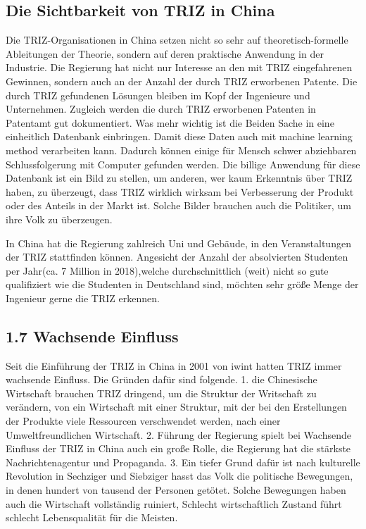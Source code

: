\documentclass[11pt,a4paper]{article}
\begin{document}
\subsection{Die Sichtbarkeit von TRIZ in China}
Die TRIZ-Organisationen in China setzen nicht so sehr auf theoretisch-formelle
Ableitungen der Theorie, sondern auf deren praktische Anwendung in der
Industrie.  Die Regierung hat nicht nur Interesse an den mit TRIZ
eingefahrenen Gewinnen, sondern auch an der Anzahl der durch TRIZ erworbenen
Patente. Die durch TRIZ gefundenen Lösungen bleiben im Kopf der Ingenieure und
Unternehmen. Zugleich werden die durch TRIZ erworbenen Patenten in Patentamt
gut dokumentiert. Was mehr wichtig ist die Beiden Sache in eine einheitlich
Datenbank einbringen. Damit diese Daten auch mit machine learning method
verarbeiten kann. Dadurch können einige für Mensch schwer abziehbaren
Schlussfolgerung mit Computer gefunden werden. Die billige Anwendung für diese
Datenbank ist ein Bild zu stellen, um anderen, wer kaum Erkenntnis über TRIZ
haben, zu überzeugt, dass TRIZ wirklich wirksam bei Verbesserung der Produkt
oder des Anteils in der Markt ist. Solche Bilder brauchen auch die Politiker,
um ihre Volk zu überzeugen.

In China hat die Regierung zahlreich Uni und Gebäude, in den Veranstaltungen
der TRIZ stattfinden können. Angesicht der Anzahl der absolvierten Studenten
per Jahr(ca. 7 Million in 2018),welche durchschnittlich (weit) nicht so gute
qualifiziert wie die Studenten in Deutschland sind, möchten  sehr größe Menge
der Ingenieur  gerne die TRIZ erkennen.  
  
\subsection{1.7 Wachsende Einfluss}

Seit die Einführung der TRIZ in China in 2001 von iwint hatten TRIZ immer
wachsende Einfluss. Die Gründen dafür sind folgende. 1. die Chinesische
Wirtschaft brauchen TRIZ dringend, um die Struktur der Writschaft zu
verändern,  von ein Wirtschaft mit einer Struktur, mit der bei den
Erstellungen der Produkte viele Ressourcen verschwendet werden,  nach einer
Umweltfreundlichen Wirtschaft. 2. Führung der Regierung spielt bei Wachsende
Einfluss der TRIZ in China auch ein große Rolle, die Regierung hat die
stärkste Nachrichtenagentur und Propaganda. 3. Ein tiefer Grund dafür ist nach
kulturelle Revolution in Sechziger und Siebziger hasst das Volk die politische
Bewegungen, in denen hundert von tausend der Personen getötet. Solche
Bewegungen haben auch die Wirtschaft vollständig ruiniert, Schlecht
wirtschaftlich Zustand führt schlecht Lebensqualität für die Meisten. 
\end{document}

